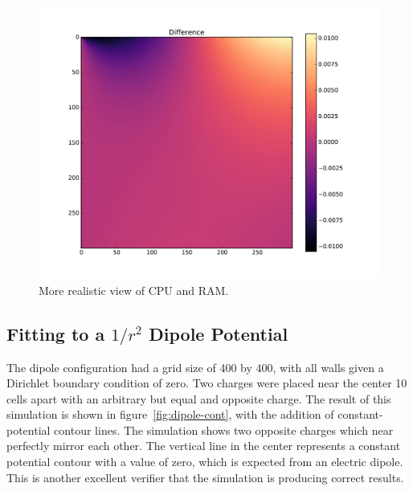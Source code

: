 	\begin{figure}[h]
	\centering
	\includegraphics[width=1.1\linewidth]{sin300_diff.pdf}
	\caption{More realistic view of CPU and RAM.}
	\label{fig:sin-difference}
	\end{figure}

\subsection{Fitting to a $1/r^2$ Dipole Potential}

The dipole configuration had a grid size of 400 by 400, with all walls given a Dirichlet boundary condition
of zero. Two charges were placed near the center 10 cells apart with an arbitrary but equal and opposite charge.
The result of this simulation is shown in figure~\ref{fig:dipole-cont}, with the addition of constant-potential
contour lines. The simulation shows two opposite charges which near perfectly mirror each other. The vertical
line in the center represents a constant potential contour with a value of zero, which is expected from an
electric dipole. This is another excellent verifier that the simulation is producing correct results.

